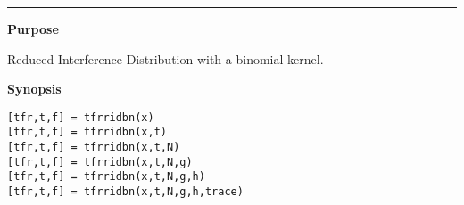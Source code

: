 

\hspace*{-1.6cm}{\Large \bf tfrridbn}

\vspace*{-.4cm}
\hspace*{-1.6cm}\rule[0in]{16.5cm}{.02cm}
\vspace*{.2cm}

{\bf \large \sf Purpose}\\
\hspace*{1.5cm}
\begin{minipage}[t]{13.5cm}
Reduced Interference Distribution with a binomial kernel.
\end{minipage}
\vspace*{.2cm}

{\bf \large \sf Synopsis}\\
\hspace*{1.5cm}
\begin{minipage}[t]{13.5cm}
\begin{verbatim}
[tfr,t,f] = tfrridbn(x)
[tfr,t,f] = tfrridbn(x,t)
[tfr,t,f] = tfrridbn(x,t,N)
[tfr,t,f] = tfrridbn(x,t,N,g)
[tfr,t,f] = tfrridbn(x,t,N,g,h)
[tfr,t,f] = tfrridbn(x,t,N,g,h,trace)
\end{verbatim}
\end{minipage}
\vspace*{.5cm}

